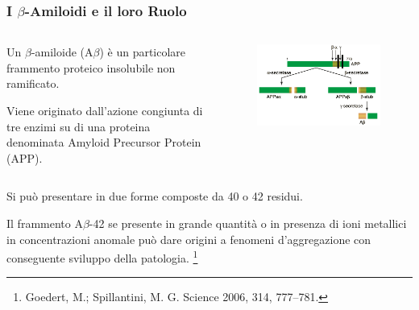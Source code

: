 \documentclass[9pt]{beamer}
\newcommand\blfootnote[1]{%
	\begingroup
	\renewcommand\thefootnote{}\footnote{#1}%
	\addtocounter{footnote}{-1}%
	\endgroup
}
\begin{document}
\begin{frame}
	\frametitle{I $\beta$-Amiloidi e il loro Ruolo}
	\bigskip
	\begin{columns}
		\begin{column}{0.5\textwidth}
			Un $\beta$-amiloide (A$\beta$) è un particolare frammento proteico insolubile non ramificato.

			\smallskip
			Viene originato dall'azione congiunta di tre enzimi su di una proteina denominata Amyloid Precursor Protein (APP).
		\end{column}
		\begin{column}{0.5\textwidth}

			\begin{figure}
				\includegraphics[width=\textwidth]{immagini/APP.png}
			\end{figure}
		\end{column}
	\end{columns}

	\medskip
	Si può presentare in due forme composte da 40 o 42 residui.

	Il frammento A$\beta$-42 se presente in grande quantità o in presenza di ioni metallici in concentrazioni anomale può dare origini a fenomeni d'aggregazione con conseguente sviluppo della patologia. \blfootnote{Goedert, M.; Spillantini, M. G. Science 2006, 314, 777–781.}

\end{frame}
\end{document}
